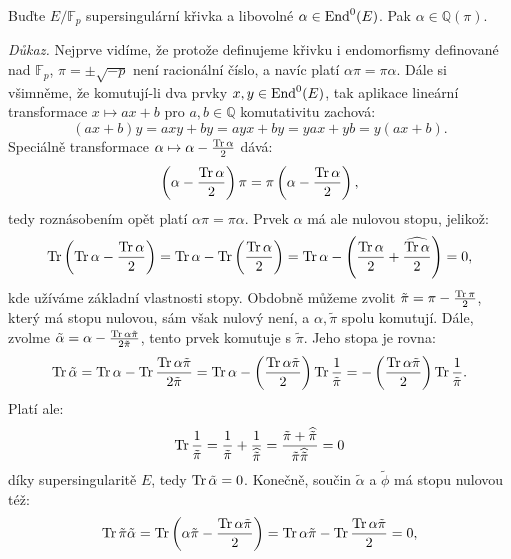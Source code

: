 \documentclass[12pt]{report}
\begin{document}
\begin{veta}
Buďte $E/\mathbb{F}_p$ supersingulární křivka a libovolné $\alpha \in \operatorname{End}^0 (E)$. Pak $\alpha \in \mathbb{Q}(\pi)$.
\end{veta}
\noindent \textit{Důkaz.} Nejprve vidíme, že protože definujeme křivku i endomorfismy definované nad $\mathbb{F}_p$, $\pi = \pm \sqrt{-p}$ není racionální číslo, a navíc platí $\alpha \pi =  \pi \alpha$.
Dále si všimněme, že komutují-li dva prvky $x,y \in \operatorname{End}^0 (E)$, tak aplikace lineární transformace $x \mapsto ax+b$ pro $a,b \in \mathbb{Q}$ komutativitu zachová:
\begin{equation*}
(ax+b)y  = axy + by = ayx + by  = yax + yb = y(ax+b).
\end{equation*}
Speciálně transformace $\alpha \mapsto \alpha - \frac{\operatorname{Tr} \alpha}{2}$ dává:
\begin{equation*}
\left( \alpha - \frac{\operatorname{Tr} \alpha}{2} \right) \pi = \pi \left( \alpha - \frac{\operatorname{Tr} \alpha}{2} \right),
\end{equation*}
tedy roznásobením opět platí $\alpha \pi = \pi \alpha$. Prvek $\alpha$ má ale nulovou stopu, jelikož: $$\operatorname{Tr} \left(\operatorname{Tr} \alpha - \frac{\operatorname{Tr} \alpha}{2} \right) = \operatorname{Tr} \alpha - \operatorname{Tr} \left( \frac{\operatorname{Tr} \alpha}{2} \right) = \operatorname{Tr} \alpha - \left(\frac{\operatorname{Tr} \alpha}{2} + \frac{\widehat{\operatorname{Tr} \alpha}}{2} \right) = 0,$$
kde užíváme základní vlastnosti stopy. Obdobně můžeme zvolit $\tilde{\pi} = \pi - \frac{\operatorname{Tr} \pi}{2}$, který má stopu nulovou, sám však nulový není, a $\alpha, \tilde{\pi}$ spolu komutují. Dále, zvolme $\tilde{\alpha} = \alpha - \frac{\operatorname{Tr} \alpha \tilde{\pi}}{2 \tilde{\pi}}$, tento prvek komutuje s $\tilde{\pi}$. Jeho stopa je rovna:
\begin{equation*}
\operatorname{Tr} \tilde{\alpha} = \operatorname{Tr} \alpha - \operatorname{Tr} \frac{\operatorname{Tr} \alpha \tilde{\pi}}{2 \tilde{\pi}} = \operatorname{Tr} \alpha - \left( \frac{\operatorname{Tr} \alpha \tilde{\pi}}{2}\right) \operatorname{Tr} \frac{1}{\tilde{\pi}} = -\left( \frac{\operatorname{Tr} \alpha \tilde{\pi}}{2}\right) \operatorname{Tr} \frac{1}{\tilde{\pi}}.
\end{equation*}
Platí ale:
\begin{equation*}
\operatorname{Tr} \frac{1}{\tilde{\pi}} = \frac{1}{\tilde{\pi}} + \frac{1}{\widehat{\tilde{\pi}}} = \frac{\tilde{\pi} + \widehat{\tilde{\pi}}}{\tilde{\pi} \widehat{\tilde{\pi}}} = 0
\end{equation*}
díky supersingularitě $E$, tedy $\operatorname{Tr} \tilde{\alpha} = 0$. Konečně, součin $\tilde{\alpha}$ a $\tilde{\phi}$ má stopu nulovou též:
\begin{equation*}
\operatorname{Tr} \tilde{\pi} \tilde{\alpha} = \operatorname{Tr} \left( \alpha \tilde{\pi} - \frac{\operatorname{Tr} \alpha \tilde{\pi}}{2} \right) = \operatorname{Tr} \alpha \tilde{\pi} - \operatorname{Tr} \frac{\operatorname{Tr} \alpha \tilde{\pi}}{2} = 0,
\end{equation*}
\end{document}
